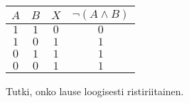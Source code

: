 \begin{tehtavasivu}
\begin{tehtava}
    \begin{vastaus}
    \begin{center}
\begin{tabular}{|c|c|c|c|}\hline
$A$ & $B$ & $X$ & $\lnot(A\land B)$\\ \hline
$1$ & $1$ & $0$ & $0$\\
$1$ & $0$ & $1$ & $1$\\
$0$ & $1$ & $1$ & $1$\\
$0$ & $0$ & $1$ & $1$\\ \hline
\end{tabular}
\end{center}

    \end{vastaus}
    
\end{tehtava}

\begin{tehtava}
     Tutki, onko lause loogisesti ristiriitainen.
    \begin{alakohdat}
    \end{alakohdat}

    \begin{vastaus}
    

\end{vastaus}
\end{tehtava}
\end{tehtavasivu}

